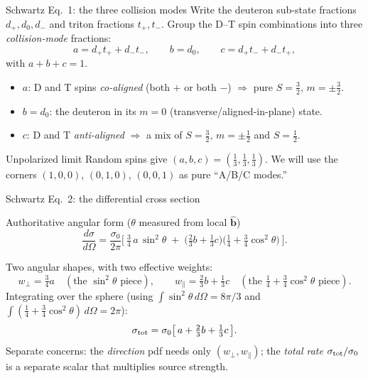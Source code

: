 \documentclass[aspectratio=169]{beamer}
\newcommand{\bb}{\hat{\bm b}}
\newcommand{\sigo}{\sigma_0}
\newcommand{\wperp}{w_\perp}
\newcommand{\wpar}{w_\parallel}
\begin{document}
\begin{frame}[t]{Schwartz Eq.~1: the three collision modes}
Write the deuteron sub-state fractions $d_+,d_0,d_-$ and triton fractions $t_+,t_-$. Group the D--T spin combinations into three \emph{collision-mode} fractions:
\[
a = d_+ t_+ + d_- t_-, \qquad
b = d_0, \qquad
c = d_+ t_- + d_- t_+,
\]
with $a+b+c=1$.
\begin{itemize}
  \item $a$: D and T spins \emph{co-aligned} (both $+$ or both $-$) $\Rightarrow$ pure $S=\tfrac32,\,m=\pm\tfrac32$.
  \item $b=d_0$: the deuteron in its $m=0$ (transverse/aligned-in-plane) state.
  \item $c$: D and T \emph{anti-aligned} $\Rightarrow$ a mix of $S=\tfrac32,\,m=\pm\tfrac12$ and $S=\tfrac12$.
\end{itemize}
\begin{block}{Unpolarized limit}
Random spins give $(a,b,c)=(\tfrac13,\tfrac13,\tfrac13)$. We will use the corners $(1,0,0)$, $(0,1,0)$, $(0,0,1)$ as pure ``A/B/C modes.''
\end{block}
\end{frame}

\begin{frame}[t]{Schwartz Eq.~2: the differential cross section}
\begin{block}{Authoritative angular form ($\theta$ measured from local $\bb$)}
\[
\frac{d\sigma}{d\Omega}
= \frac{\sigo}{2\pi}\Big[\ \tfrac{3}{4}\,a\,\sin^2\theta
\;+\; \big(\tfrac{2}{3}b + \tfrac{1}{3}c\big)\big(\tfrac{1}{4}+\tfrac{3}{4}\cos^2\theta\big)\ \Big].
\]
\end{block}
Two angular shapes, with two effective weights:
\[
\wperp = \tfrac{3}{4}a \quad(\text{the }\sin^2\theta\text{ piece}),
\qquad
\wpar = \tfrac{2}{3}b + \tfrac{1}{3}c \quad(\text{the }\tfrac14+\tfrac34\cos^2\theta\text{ piece}).
\]
Integrating over the sphere (using $\int\sin^2\theta\,d\Omega = 8\pi/3$ and $\int(\tfrac14+\tfrac34\cos^2\theta)\,d\Omega = 2\pi$):
\[
\sigma_{\rm tot} = \sigo\big[\,a + \tfrac{2}{3}b + \tfrac{1}{3}c\,\big].
\]
\alert{Separate concerns:} the \emph{direction} pdf needs only $(\wperp,\wpar)$; the \emph{total rate} $\sigma_{\rm tot}/\sigo$ is a separate scalar that multiplies source strength.
\end{frame}
\end{document}
